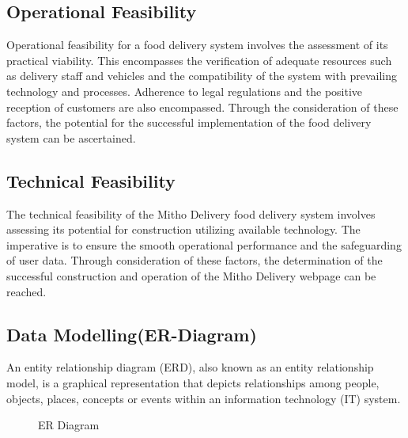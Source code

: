 \subsection*{Operational Feasibility}
Operational feasibility for a food delivery system involves the assessment of its practical viability. This encompasses the verification of adequate resources such as delivery staff and vehicles and the compatibility of the system with prevailing technology and processes. Adherence to legal regulations and the positive reception of customers are also encompassed. Through the consideration of these factors, the potential for the successful implementation of the food delivery system can be ascertained.

\subsection*{Technical Feasibility}
The technical feasibility of the Mitho Delivery food delivery system involves assessing its potential for construction utilizing available technology. The imperative is to ensure the smooth operational performance and the safeguarding of user data. Through consideration of these factors, the determination of the successful construction and operation of the Mitho Delivery webpage can be reached.

\newpage
\subsection{Data Modelling(ER-Diagram)}
An entity relationship diagram (ERD), also known as an entity relationship model, is a graphical representation that depicts relationships among people, objects, places, concepts or events within an information technology (IT) system.

\begin{figure}[h]    
    \caption{ER Diagram}
\end{figure}


